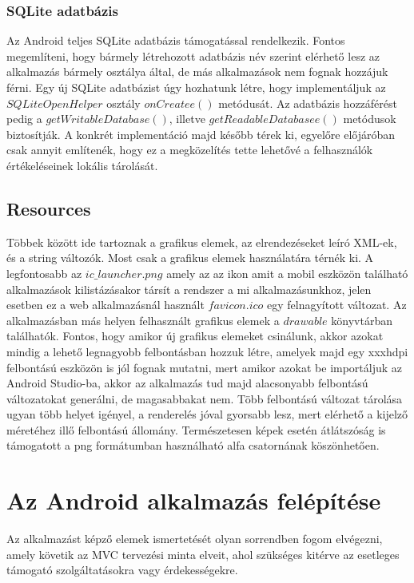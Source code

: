 \documentclass[12pt]{report}
\theoremstyle{definition}
\begin{document}
	\subsubsection{SQLite adatbázis}
	Az Android teljes SQLite adatbázis támogatással rendelkezik. Fontos megemlíteni, hogy bármely létrehozott adatbázis név szerint elérhető lesz az alkalmazás bármely osztálya által, de más alkalmazások nem fognak hozzájuk férni. Egy új SQLite adatbázist úgy hozhatunk létre, hogy implementáljuk az $SQLiteOpenHelper$ osztály $onCreatee\left(\right)$ metódusát. Az adatbázis hozzáférést pedig a $getWritableDatabase\left(\right)$, illetve \linebreak$getReadableDatabasee\left(\right)$ metódusok biztosítják. A konkrét implementáció majd később térek ki, egyelőre előjáróban csak annyit említenék, hogy ez a megközelítés tette lehetővé a felhasználók értékeléseinek lokális tárolását.
	
	\subsection*{Resources}
	Többek között ide tartoznak a grafikus elemek, az elrendezéseket leíró XML-ek, és a string változók. Most csak a grafikus elemek használatára térnék ki. A legfontosabb az $ic\_launcher.png$ amely az az ikon amit a mobil eszközön található alkalmazások kilistázásakor társít a rendszer a mi alkalmazásunkhoz, jelen esetben ez a web alkalmazásnál használt $favicon.ico$ egy felnagyított változat. Az alkalmazásban más helyen felhasznált grafikus elemek a $drawable$ könyvtárban találhatók. Fontos, hogy amikor új grafikus elemeket csinálunk, akkor azokat mindig a lehető legnagyobb felbontásban hozzuk létre, amelyek majd egy xxxhdpi felbontású eszközön is jól fognak mutatni, mert amikor azokat be importáljuk az Android Studio-ba, akkor az alkalmazás tud majd alacsonyabb felbontású változatokat generálni, de magasabbakat nem. Több felbontású változat tárolása ugyan több helyet igényel, a renderelés jóval gyorsabb lesz, mert elérhető a kijelző méretéhez illő felbontású állomány. Természetesen képek esetén átlátszóság is támogatott a png formátumban használható alfa csatornának köszönhetően.
	
	\section{Az Android alkalmazás felépítése}
	Az alkalmazást képző elemek ismertetését olyan sorrendben fogom elvégezni, amely követik az MVC tervezési minta elveit, ahol szükséges kitérve az esetleges támogató szolgáltatásokra vagy érdekességekre.
	
\end{document}
